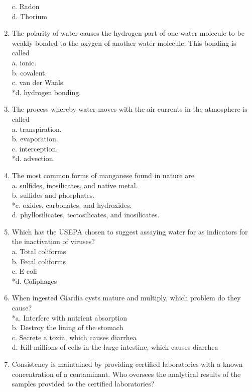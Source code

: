 \begin{enumerate}[1.]
c. Radon\\
d. Thorium\\
\item The polarity of water causes the hydrogen part of one water molecule to be weakly bonded to the oxygen of another water molecule. This bonding is called\\
a. ionic.\\
b. covalent.\\
c. van der Waals.\\
*d. hydrogen bonding.
\item The process whereby water moves with the air currents in the atmosphere is called\\
a. transpiration.\\
b. evaporation.\\
c. interception.\\
*d. advection.\\
\item The most common forms of manganese found in nature are\\
a. sulfides, inosilicates, and native metal.\\
b. sulfides and phosphates.\\
*c. oxides, carbonates, and hydroxides.\\
d. phyllosilicates, tectosilicates, and inosilicates.\\
\item Which has the USEPA chosen to suggest assaying water for as indicators for the inactivation of viruses?\\
a. Total coliforms\\
b. Fecal coliforms\\
c. E-coli\\
*d. Coliphages
\item When ingested Giardia cysts mature and multiply, which problem do they cause?\\
*a. Interfere with nutrient absorption\\
b. Destroy the lining of the stomach\\
c. Secrete a toxin, which causes diarrhea\\
d. Kill millions of cells in the large intestine, which causes diarrhea\\
\item Consistency is maintained by providing certified laboratories with a known concentration of a contaminant. Who oversees the analytical results of the samples provided to the certified laboratories?\\

\end{enumerate}

